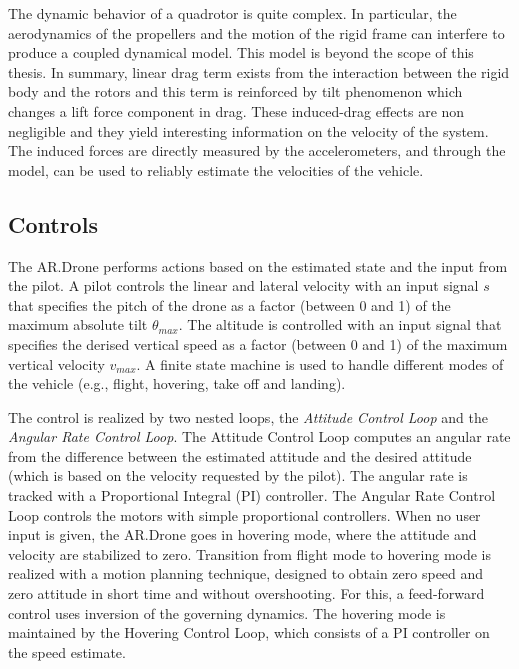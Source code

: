 The dynamic behavior of a quadrotor is quite complex.
In particular, the aerodynamics of the propellers and the motion of the rigid frame can interfere to produce a coupled dynamical model.
This model is beyond the scope of this thesis.
In summary, linear drag term exists from the interaction between the rigid body and the rotors and this term is reinforced by tilt phenomenon which changes a lift force component in drag.
These induced-drag effects are non negligible and they yield interesting information on the velocity of the system.
The induced forces are directly measured by the accelerometers, and through the model, can be used to reliably estimate the velocities of the vehicle.



\subsection{Controls}
\label{sec:platform-controls}
The AR.Drone performs actions based on the estimated state and the input from the pilot.
A pilot controls the linear and lateral velocity with an input signal $s$ that specifies the pitch of the drone as a factor (between 0 and 1) of the maximum absolute tilt $\theta_{max}$.
The altitude is controlled with an input signal that specifies the derised vertical speed as a factor (between 0 and 1) of the maximum vertical velocity $v_{max}$.
A finite state machine is used to handle different modes of the vehicle (e.g., flight, hovering, take off and landing).

The control is realized by two nested loops, the \textit{Attitude Control Loop} and the \textit{Angular Rate Control Loop}.
The Attitude Control Loop computes an angular rate from the difference between the estimated attitude and the desired attitude (which is based on the velocity requested by the pilot).
The angular rate is tracked with a Proportional Integral (PI) controller.
The Angular Rate Control Loop controls the motors with simple proportional controllers.
When no user input is given, the AR.Drone goes in hovering mode, where the attitude and velocity are stabilized to zero.
Transition from flight mode to hovering mode is realized with a motion planning technique, designed to obtain zero speed and zero attitude in short time and without overshooting.
For this, a feed-forward control uses inversion of the governing dynamics.
The hovering mode is maintained by the Hovering Control Loop, which consists of a PI controller on the speed estimate.

